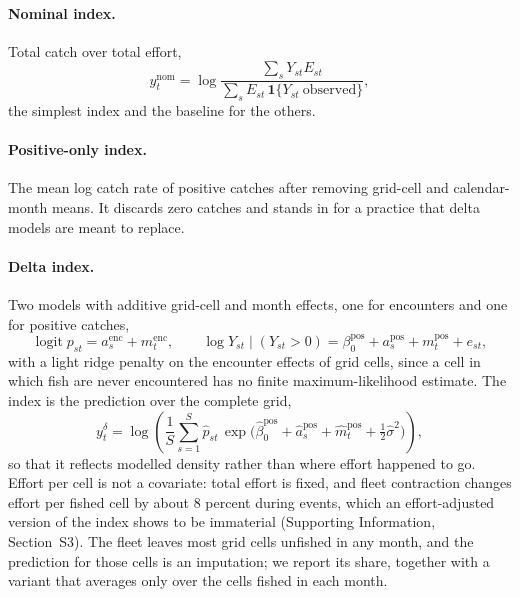 \documentclass[11pt,a4paper]{article}
\newcommand{\vt}[1]{\text{#1}}
\begin{document}
\paragraph{Nominal index.} Total catch over total effort,
\begin{equation}
y^{\vt{nom}}_t = \log\frac{\sum_s Y_{st}E_{st}}{\sum_s E_{st}\,\mathbf{1}\{Y_{st}\ \vt{observed}\}},
\label{eq:nominal}
\end{equation}
the simplest index and the baseline for the others.

\paragraph{Positive-only index.} The mean log catch rate of positive catches after removing grid-cell and calendar-month means. It discards zero catches and stands in for a practice that delta models are meant to replace.

\paragraph{Delta index.} Two models with additive grid-cell and month effects, one for encounters and one for positive catches,
\begin{equation}
\operatorname{logit} p_{st} = a^{\vt{enc}}_s + m^{\vt{enc}}_t, \qquad \log Y_{st}\mid(Y_{st}>0) = \beta^{\vt{pos}}_0 + a^{\vt{pos}}_s + m^{\vt{pos}}_t + e_{st},
\label{eq:delta}
\end{equation}
with a light ridge penalty on the encounter effects of grid cells, since a cell in which fish are never encountered has no finite maximum-likelihood estimate. The index is the prediction over the complete grid,
\begin{equation}
y^{\delta}_t = \log\left(\frac1S\sum_{s=1}^S \hat p_{st}\,\exp\!\big(\hat\beta^{\vt{pos}}_0 + \hat a^{\vt{pos}}_s + \hat m^{\vt{pos}}_t + \tfrac12\hat\sigma^2\big)\right),
\label{eq:deltaindex}
\end{equation}
so that it reflects modelled density rather than where effort happened to go. Effort per cell is not a covariate: total effort is fixed, and fleet contraction changes effort per fished cell by about 8 percent during events, which an effort-adjusted version of the index shows to be immaterial (Supporting Information, Section~S3). The fleet leaves most grid cells unfished in any month, and the prediction for those cells is an imputation; we report its share, together with a variant that averages only over the cells fished in each month.
\end{document}
